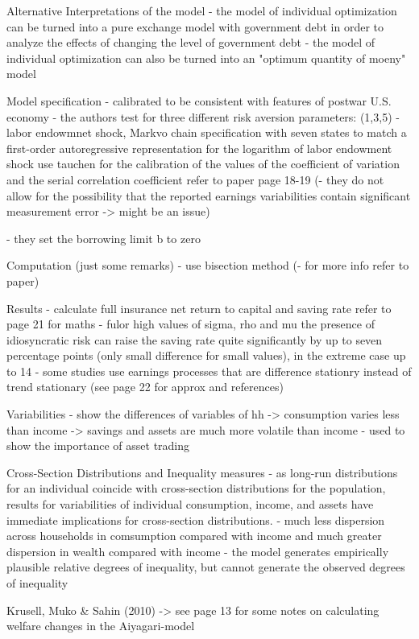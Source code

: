 Alternative Interpretations of the model
- the model of individual optimization can be turned into a pure exchange model with government debt in order to analyze the effects of changing the level of government debt
- the model of individual optimization can also be turned into an "optimum quantity of moeny" model

Model specification
- calibrated to be consistent with features of postwar U.S. economy
- the authors test for three different risk aversion parameters: (1,3,5)
- labor endowmnet shock, Markvo chain specification with seven states to match a first-order autoregressive representation for the logarithm of labor endowment shock
	use tauchen
	for the calibration of the values of the coefficient of variation and the serial correlation coefficient refer to paper page 18-19
	(- they do not allow for the possibility that the reported earnings variabilities contain significant measurement error -> might be an issue)

- they set the borrowing limit b to zero

Computation (just some remarks)
- use bisection method
(- for more info refer to paper)

Results 
- calculate full insurance net return to capital and saving rate refer to page 21 for maths
	- fulor high values of sigma, rho and mu the presence of idiosyncratic risk can raise the saving rate quite significantly by up to seven percentage points (only small difference for small values), in the extreme case up to 14%
- some studies use earnings processes that are difference stationry instead of trend stationary (see page 22 for approx and references)

Variabilities
- show the differences of variables of hh
	-> consumption varies less than income 
	-> savings and assets are much more volatile than income  
- used to show the importance of asset trading 

Cross-Section Distributions and Inequality measures
- as long-run distributions for an individual coincide with cross-section distributions for the population, results for variabilities of individual consumption, income, and assets have immediate implications for cross-section distributions. 
- much less dispersion across households in comsumption compared with income and much greater dispersion in wealth compared with income 
- the model generates empirically plausible relative degrees of inequality, but cannot generate the observed degrees of inequality 


Krusell, Muko & Sahin (2010)
-> see page 13 for some notes on calculating welfare changes in the Aiyagari-model












